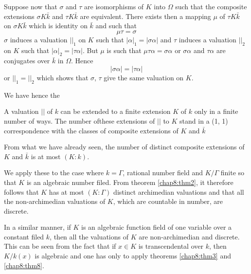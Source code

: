 Suppose now that $\sigma$ and $\tau$ are isomorphisms of $K$ into
$\Omega$ such that the composite extensions $\sigma K \bar{k}$ and
$\tau K \bar{k}$ are equivalent. There exists then a mapping $\mu$ of
$\tau K \bar{k}$ on $\sigma K \bar{k}$ which is identity on $\bar{k}$
and such that  
$$
\mu \tau = \sigma 
$$ 
$\sigma$ induces a valuation $| |_1$ on $K$ such that $|\alpha|_1 =
|\sigma \alpha|$ and $\tau$ induces a valuation $| |_2$ on $K$ such
that $|\alpha|_2 = |\tau \alpha |$. But $\mu$ is such that $\mu \tau
\alpha = \sigma \alpha$ or $\sigma \alpha$ and $\tau \alpha$ are
conjugates over $\bar{k}$ in $\Omega$. Hence  
$$
| \sigma \alpha| = |\tau \alpha|
$$
or $||_1 = | |_2$ which shows that $\sigma$, $\tau$ give the same
valuation on $K$. 

We have hence the 

\begin{thm}\label{chap8:thm8}%
A valuation $||$ of $k$ can be extended to a finite extension $K$ of
$k$ only in a finite number of ways. The number of\pageoriginale these
extensions of $||$ to $K$ stand in a (1, 1) correspondence with the
classes of composite extensions of $K$ and $\bar{k}$  
\end{thm}

From what we have already seen, the number of distinct composite
extensions of $K$ and $\bar{k}$ is at most $(K : k)$. 

We apply these to the case where $k = \Gamma$, rational number field
and $K /\Gamma$ finite so that $K$ is an algebraic number filed. From
theorem \ref{chap8:thm2}, it therefore follows that $K$ has at most
$(K : \Gamma)$ 
distinct archimedian valuations and that all the non-archimedian
valuations of $K$, which are countable in number, are discrete. 

In a similar manner, if $K$ is an algebraic function field of one
variable over a constant filed $k$, then all the valuations of $K$ are
non-archimedian and discrete. This can be seen from the fact that if
$x \in K$ is transcendental over $k$, then $K /k(x)$ is algebraic and
one has only to apply theorems \ref{chap8:thm3} and \ref{chap8:thm8}.   



